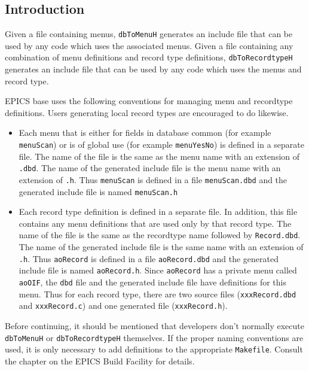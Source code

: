 \subsection{Introduction}

Given a file containing menus, \verb|dbToMenuH| generates an include file that can be used by any code which uses the associated menus.
Given a file containing any combination of menu definitions and record type definitions, \verb|dbToRecordtypeH| generates an include file that can be used by any code which uses the menus and record type.

EPICS base uses the following conventions for managing menu and recordtype definitions.
Users generating local record types are encouraged to do likewise.

\begin{itemize}
\item Each menu that is either for fields in database common (for example \verb|menuScan|) or is of global use (for example \verb|menuYesNo|) is defined in a separate file.
The name of the file is the same as the menu name with an extension of \verb|.dbd|.
The name of the generated include file is the menu name with an extension of \verb|.h|.
Thus \verb|menuScan| is defined in a file \verb|menuScan.dbd| and the generated include file is named \verb|menuScan.h|

\item Each record type definition is defined in a separate file.
In addition, this file contains any menu definitions that are used only by that record type.
The name of the file is the same as the recordtype name followed by \verb|Record.dbd|.
The name of the generated include file is the same name with an extension of \verb|.h|.
Thus \verb|aoRecord| is defined in a file \verb|aoRecord.dbd| and the generated include file is named \verb|aoRecord.h|.
Since \verb|aoRecord| has a private menu called \verb|aoOIF|, the \verb|dbd| file and the generated include file have definitions for this menu.
Thus for each record type, there are two source files (\verb|xxxRecord.dbd| and \verb|xxxRecord.c|) and one generated file (\verb|xxxRecord.h|).
\end{itemize}

Before continuing, it should be mentioned that developers don't normally execute \verb|dbToMenuH| or \verb|dbToRecordtypeH| themselves.
If the proper naming conventions are used, it is only necessary to add definitions to the appropriate \verb|Makefile|.
Consult the chapter on the EPICS Build Facility for details.

